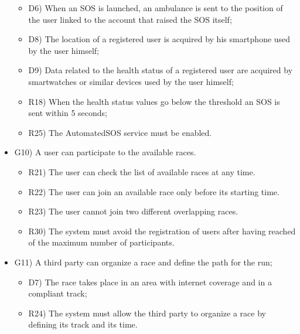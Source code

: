 \documentclass{article}
\begin{document}
\begin{legal}
\begin{legal}
\begin{legal}
\begin{itemize}
				{\normalfont
					\begin{itemize}
					\item D6) When an SOS is launched, an ambulance is sent to the position of the user linked to the account that raised the SOS itself;\\
					\item D8) The location of a registered user is acquired by his smartphone used by the user himself;\\
	 				\item D9) Data related to the health status of a registered user are acquired by smartwatches or similar devices used by the user himself;\\
					\item R18) When the health status values go below the threshold an SOS is sent within 5 seconds;\\
	 				\item R25) The AutomatedSOS service must be enabled.\\
					\end{itemize}
				}
				\item G10) A user can participate to the available races. \\
				{\normalfont
					\begin{itemize}
					\item R21) The user can check the list of available races at any time.\\
					\item R22) The user can join an available race only before its starting time.\\
	 				\item R23) The user cannot join two different overlapping races.\\
					\item R30) The system must avoid the registration of users after having reached of the maximum number of participants.\\
					\end{itemize}
				}
				\item G11) A third party can organize a race and define the path for the run;\\
				{\normalfont
					\begin{itemize}
					\item D7) The race takes place in an area with internet coverage and in a compliant track;\\
					\item R24) The system must allow the third party to organize a race by defining its track and its time.\\

\end{itemize}}
\end{itemize}
\end{legal}
\end{legal}
\end{legal}
\end{document}
